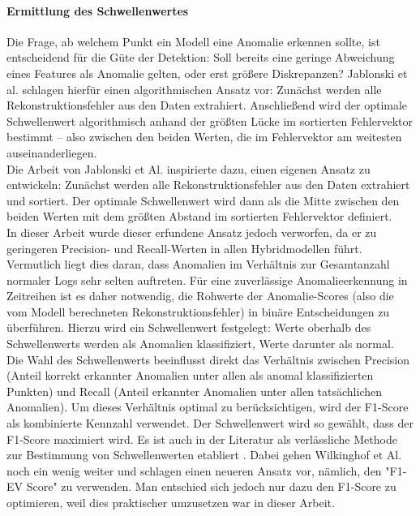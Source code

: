 \documentclass[a4paper,12pt]{article}
\begin{document}
	\paragraph{Ermittlung des Schwellenwertes}
	Die Frage, ab welchem Punkt ein Modell eine Anomalie erkennen sollte, ist entscheidend für die Güte der Detektion: Soll bereits eine geringe Abweichung eines Features als Anomalie gelten, oder erst größere Diskrepanzen? Jablonski et al. \cite{jablonski2023automatic} schlagen hierfür einen algorithmischen Ansatz vor: Zunächst werden alle Rekonstruktionsfehler aus den Daten extrahiert. Anschließend wird der optimale Schwellenwert algorithmisch anhand der größten Lücke im sortierten Fehlervektor bestimmt – also zwischen den beiden Werten, die im Fehlervektor am weitesten auseinanderliegen. 
	\\[0.5em]
	Die Arbeit von Jablonski et Al. inspirierte dazu, einen eigenen Ansatz zu entwickeln: Zunächst werden alle Rekonstruktionsfehler aus den Daten extrahiert und sortiert. Der optimale Schwellenwert wird dann als die Mitte zwischen den beiden Werten mit dem größten Abstand im sortierten Fehlervektor definiert.
	\\[0.5em]
	In dieser Arbeit wurde dieser erfundene Ansatz jedoch verworfen, da er zu geringeren Precision- und Recall-Werten in allen Hybridmodellen führt. Vermutlich liegt dies daran, dass Anomalien im Verhältnis zur Gesamtanzahl normaler Logs sehr selten auftreten. Für eine zuverlässige Anomalieerkennung in Zeitreihen ist es daher notwendig, die Rohwerte der Anomalie-Scores (also die vom Modell berechneten Rekonstruktionsfehler) in binäre Entscheidungen zu überführen. Hierzu wird ein Schwellenwert festgelegt: Werte oberhalb des Schwellenwerts werden als Anomalien klassifiziert, Werte darunter als normal.
	\\[0.5em]
	Die Wahl des Schwellenwerts beeinflusst direkt das Verhältnis zwischen Precision (Anteil korrekt erkannter Anomalien unter allen als anomal klassifizierten Punkten) und Recall (Anteil erkannter Anomalien unter allen tatsächlichen Anomalien). Um dieses Verhältnis optimal zu berücksichtigen, wird der F1-Score als kombinierte Kennzahl verwendet. Der Schwellenwert wird so gewählt, dass der F1-Score maximiert wird. Es ist auch in der Literatur als verlässliche Methode zur Bestimmung von Schwellenwerten etabliert \cite{wilkinghoff2024f1ev}. Dabei gehen Wilkinghof et Al. noch ein wenig weiter und schlagen einen neueren Ansatz vor, nämlich, den "F1-EV Score" zu verwenden. Man entschied sich jedoch nur dazu den F1-Score zu optimieren, weil dies praktischer umzusetzen war in dieser Arbeit.
	
\end{document}
